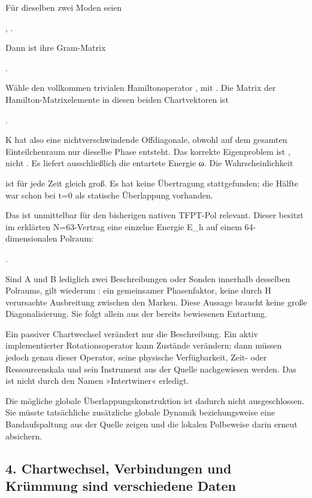 Für dieselben zwei Moden seien

, .

Dann ist ihre Gram-Matrix

.

Wähle den vollkommen trivialen Hamiltonoperator , mit
. Die Matrix der Hamilton-Matrixelemente in
diesen beiden Chartvektoren ist

.

K hat also eine nichtverschwindende Offdiagonale, obwohl auf dem
gesamten Einteilchenraum nur dieselbe Phase
 entsteht. Das korrekte Eigenproblem
ist , nicht . Es liefert
ausschließlich die entartete Energie ω. Die Wahrscheinlichkeit


ist für jede Zeit gleich groß. Es hat keine Übertragung stattgefunden;
die Hälfte war schon bei t=0 als statische Überlappung vorhanden.

Das ist unmittelbar für den bisherigen nativen TFPT-Pol relevant. Dieser
besitzt im erklärten N=63-Vertrag eine einzelne Energie E\_h auf einem
64-dimensionalen Polraum:

.

Sind A und B lediglich zwei Beschreibungen oder Sonden innerhalb
desselben Polraums, gilt wiederum : ein gemeinsamer
Phasenfaktor, keine durch H verursachte Ausbreitung zwischen den Marken.
Diese Aussage braucht keine große Diagonalisierung. Sie folgt allein aus
der bereits bewiesenen Entartung.

Ein passiver Chartwechsel verändert nur die Beschreibung. Ein aktiv
implementierter Rotationsoperator kann Zustände verändern; dann müssen
jedoch genau dieser Operator, seine physische Verfügbarkeit, Zeit- oder
Ressourcenskala und sein Instrument aus der Quelle nachgewiesen werden.
Das ist nicht durch den Namen »Intertwiner« erledigt.

Die mögliche globale Überlappungskonstruktion ist dadurch nicht
ausgeschlossen. Sie müsste tatsächliche zusätzliche globale Dynamik
beziehungsweise eine Bandaufspaltung aus der Quelle zeigen und die
lokalen Polbeweise darin erneut absichern.

\subsection{4. Chartwechsel, Verbindungen und Krümmung sind verschiedene
Daten}\label{chartwechsel-verbindungen-und-kruxfcmmung-sind-verschiedene-daten}


